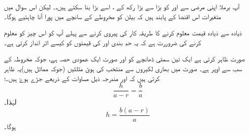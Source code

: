 آپ برملا اپنی مرضی سے  اور  کو بڑا سے بڑا رکھ کے ، اسے بڑا بنا سکتے ہیں،۔ لیکن اس سوال میں متغیرات اس اقنضا کے پابند ہیں کہ بیلن کو مخروطے کے سانچے میں پورا آنا چاہئیے ہوگا۔

ذیادہ سے ذیادہ قیمت معلوم کرنے کا طریقہ کار کی پیروی کرنے سے پہلے آپ کو اس چیز کو معلوم کرنے کی ضروررت ہے کہ یہ حد بندی   اور  کی قیمتوں کو کیسے اثر انداز کرتی ہے۔

صورت  ظاہر کرتی ہے ایک تین سمتی ڈھانچے کو اور صورت ایک عمودی حصہ  ہے، جوکہ مخروطہ کے سب سے اوپر ہے۔ صورت  میں بھاری لکیروں سے منتخب کی ہوئ مثلثیں (جوکہ مماثل ہیں)یہ ظاہر کرتی ہیں کہ  اور  مندرجہ ذیل مساوات کے ذریعے جڑے ہوۓ ہیں۔؛
 \[ \frac{h}{a-r}=\frac{b}{a} \]
لہٰذا۔
 \[ h= \frac{b(a-r)}{a} \]
ہوگا۔

